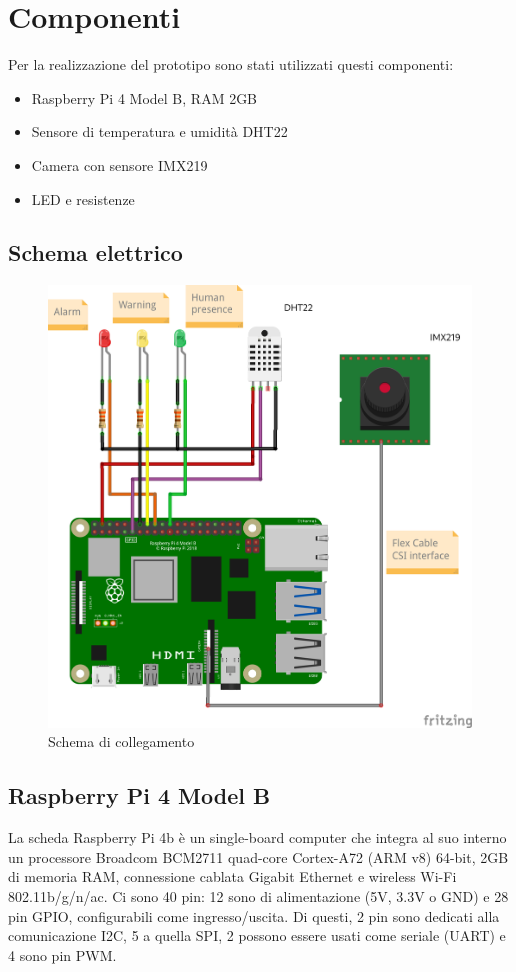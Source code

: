 \documentclass[italian,12pt,a4paper,oneside,final]{report}
\begin{document}
\newpage

\section{Componenti}
Per la realizzazione del prototipo sono stati utilizzati questi componenti:

\begin{itemize}
\item Raspberry Pi 4 Model B, RAM 2GB 
\item Sensore di temperatura e umidità DHT22
\item Camera con sensore IMX219
\item LED e resistenze
\end{itemize}

\subsection{Schema elettrico}
\begin{figure}[h]
	\centering
	\includegraphics[scale=0.8]{rpi4_temp_sensor.png}
	\caption{Schema di collegamento}
	\label{fig:raspberry}
\end{figure}

\newpage

\subsection{Raspberry Pi 4 Model B}
La scheda Raspberry Pi 4b è un single-board computer che integra al suo interno un processore Broadcom BCM2711 quad-core Cortex-A72 (ARM v8) 64-bit,  2GB di memoria RAM, connessione cablata Gigabit Ethernet e wireless Wi-Fi 802.11b/g/n/ac.
Ci sono 40 pin: 12 sono di alimentazione (5V, 3.3V o GND) e 28 pin GPIO, configurabili come ingresso/uscita. 
Di questi, 2 pin sono dedicati alla comunicazione I2C, 5 a quella SPI, 2 possono essere usati come seriale (UART) e 4 sono pin PWM. 
\end{document}
